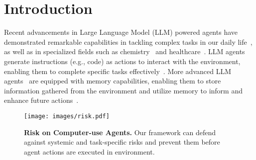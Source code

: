 \section{Introduction}
Recent advancements in Large Language Model (LLM) powered agents have demonstrated remarkable capabilities in tackling complex tasks in our daily life~\cite{liu2023agentbench, zheng2023seeact, zhou2024webarenarealisticwebenvironment, xie2024travelplannerbenchmarkrealworldplanning, mei2024llm, hua2024trustagent, lin-etal-2024-battleagent, zhang2024aimeetsfinancestockagent, mei2024aiosllmagentoperating, gu2024middlewarellmstoolsinstrumental}, as well as in specialized fields such as chemistry~\cite{yu2024chemagent, bran2023chemcrowaugmentinglargelanguagemodels, Boiko2023, ghafarollahi2024protagentsproteindiscoverylarge} and healthcare~\cite{abbasian2024conversationalhealthagentspersonalized, shi2024ehragentcodeempowerslarge, yang2024psychogatnovelpsychologicalmeasurement, tu2024conversationaldiagnosticai, li2024agenthospitalsimulacrumhospital}. LLM agents generate instructions (e.g., code) as actions to interact with the environment, enabling them to complete specific tasks effectively~\cite{yao2023reactsynergizingreasoningacting}. More advanced LLM agents~\cite{zhu2023ghostminecraftgenerallycapable, Zhu_2023, park2023generativeagentsinteractivesimulacra, shinn2023reflexionlanguageagentsverbal} are equipped with memory capabilities, enabling them to store information gathered from the environment and utilize memory to inform and enhance future actions~\cite{Wang_2024}.
\begin{figure}[!t]
    \centering
    \texttt{[image: images/risk.pdf]}
    \caption{\small \textbf{ Risk on Computer-use Agents.} Our framework can defend against systemic and task-specific risks and prevent them before agent actions are executed in environment.}
    \vspace{-0.8em}
    \label{fig:risks}
    \vspace{-1.0em}
\end{figure}

